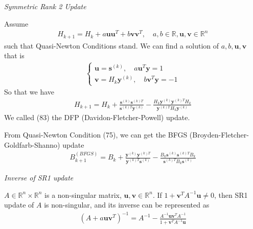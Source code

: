 \documentclass[runningheads]{llncs}
\begin{document}
\vspace{.3em}
\par
\noindent\textit{Symmetric Rank 2 Update}
\par
Assume
\begin{align}
    H_{k+1} = H_k + a \mathbf{u}\mathbf{u}^T +
     b \mathbf{v}\mathbf{v}^T,
     \quad a, b \in \mathbb{R}, \mathbf{u}, \mathbf{v} \in \mathbb{R}^n
\end{align}
such that Quasi-Newton Conditions stand.
We can find a solution of $a, b, \mathbf{u}, \mathbf{v}$ that is
\begin{align}
    \left\{
    \begin{array}{ll}
        \mathbf{u} = \mathbf{s}^{(k)}, 
        \quad a \mathbf{u}^T \mathbf{y} = 1 \\
        \mathbf{v} = H_k \mathbf{y}^{(k)}, 
        \quad b \mathbf{v}^T \mathbf{y} = -1
    \end{array}
    \right.
\end{align}
So that we have
\begin{align}
    H_{k+1} = H_k + \frac{\mathbf{s}^{(k)}\mathbf{s}^{(k)T}}
    {\mathbf{s}^{(k)T} \mathbf{y}^{(k)}} - 
    \frac{H_k\mathbf{y}^{(k)} \mathbf{y}^{(k)T} H_k}
    {\mathbf{y}^{(k)T}H_k\mathbf{y}^{(k)}}
\end{align}
We called (83) the DFP (Davidon-Fletcher-Powell) update.
\par
From Quasi-Newton Condition (75), we can get the
BFGS (Broyden-Fletcher-Goldfarb-Shanno) update
\begin{align}
    B_{k+1}^{(BFGS)} = B_k +
    \frac{\mathbf{y}^{(k)}\mathbf{y}^{(k)T}}
    {\mathbf{y}^{(k)T} \mathbf{s}^{(k)}}
    - \frac{B_k \mathbf{s}^{(k)}\mathbf{s}^{(k)T} B_k}
    {\mathbf{s}^{(k)T} B_k \mathbf{s}^{(k)}}
\end{align}
\vspace{.3em}
\par\noindent\textit{Inverse of SR1 update}
\begin{theorem}
    $A \in \mathbb{R}^n \times \mathbb{R}^n$ is a 
    non-singular matrix, $\mathbf{u}, \mathbf{v} \in \mathbb{R}^n$.
    If $1 + \mathbf{v}^TA^{-1}\mathbf{u} \neq 0$,
    then SR1 update of $A$ is non-singular, and its inverse
    can be represented as
    \begin{align}
        (A + a\mathbf{u}\mathbf{v}^T)^{-1} = 
        A^{-1} - \frac{A^{-1}\mathbf{u}\mathbf{v}^TA^{-1}}
        {1 + \mathbf{v}^TA^{-1}\mathbf{u}}
    \end{align}
\end{theorem}
\end{document}
